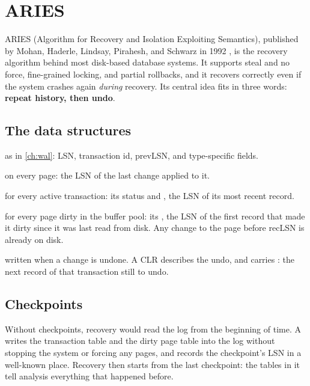 \chapter{ARIES}
\label{ch:aries}

ARIES (Algorithm for Recovery and Isolation Exploiting Semantics), published by
Mohan, Haderle, Lindsay, Pirahesh, and Schwarz in 1992 \cite{aries}, is the
recovery algorithm behind most disk-based database systems. It supports steal
and no force, fine-grained locking, and partial rollbacks, and it recovers
correctly even if the system crashes again \emph{during} recovery. Its central
idea fits in three words: \textbf{repeat history, then undo}.

\section{The data structures}

\begin{description}[leftmargin=1.2em]
\item[Log records] as in \cref{ch:wal}: LSN, transaction id, prevLSN, and type-specific fields.
\item[pageLSN] on every page: the LSN of the last change applied to it.
\item[Transaction table] for every active transaction: its status and , the LSN of its most recent record.
\item[Dirty page table] for every page dirty in the buffer pool: its , the LSN of the first record that made it dirty since it was last read from disk. Any change to the page before recLSN is already on disk.
\item[Compensation log records (CLRs)] written when a change is undone. A CLR describes the undo, and carries : the next record of that transaction still to undo.
\end{description}

\section{Checkpoints}

Without checkpoints, recovery would read the log from the beginning of time. A
 writes the transaction table and the dirty page table
into the log without stopping the system or forcing any pages, and records the
checkpoint's LSN in a well-known place. Recovery then starts from the last
checkpoint: the tables in it tell analysis everything that happened before.

